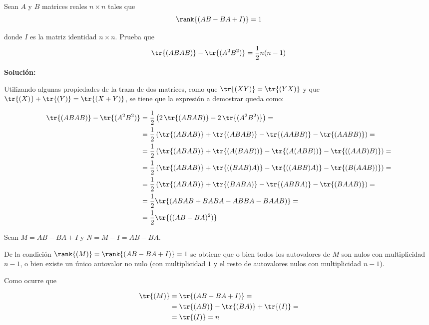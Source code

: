 \documentclass[../../main.tex]{subfiles}
\begin{document}
  \begin{shaded}
    Sean $A$ y $B$ matrices reales $n \times n$ tales que
    $$
    \rank{(AB - BA + I)} = 1
    $$

    donde $I$ es la matriz identidad $n \times n$. Prueba que
    $$
    \tr{(ABAB)} - \tr{(A^2 B^2)} = \frac{1}{2} n (n - 1)
    $$
  \end{shaded}

  \textbf{Solución:}

  Utilizando algunas propiedades de la traza de dos matrices, como que $\tr{(XY)} = \tr{(YX)}$ y que $\tr{(X)} + \tr{(Y)} = \tr{(X + Y)}$, se tiene que la expresión a demostrar queda como:

  \begin{equation*}
    \begin{split}
      \tr{(ABAB)} - \tr{(A^2 B^2)} & =
      \frac{1}{2}\left(2 \, \tr{(ABAB)} - 2 \, \tr{(A^2 B^2)}\right) = \\ & =
      \frac{1}{2}\left(\tr{(ABAB)} + \tr{(ABAB)} - \tr{(AABB)} - \tr{(AABB)}\right) = \\ & =
      \frac{1}{2}\left(\tr{(ABAB)} + \tr{(A(BAB))} - \tr{(A(ABB))} - \tr{((AAB)B)}\right) = \\ & =
      \frac{1}{2}\left(\tr{(ABAB)} + \tr{((BAB)A)} - \tr{((ABB)A)} - \tr{(B(AAB))}\right) = \\ & =
      \frac{1}{2}\left(\tr{(ABAB)} + \tr{(BABA)} - \tr{(ABBA)} - \tr{(BAAB)}\right) = \\ & =
      \frac{1}{2}\tr{(ABAB + BABA - ABBA - BAAB)} = \\ & =
      \frac{1}{2}\tr{((AB - BA)^2)}
    \end{split}
  \end{equation*}

  Sean $M = AB - BA + I$ y $N = M - I = AB - BA$.

  De la condición $\rank{(M)} = \rank{(AB - BA + I)} = 1$ se obtiene que o bien todos los autovalores de $M$ son nulos con multiplicidad $n - 1$, o bien existe un único autovalor no nulo (con multiplicidad $1$ y el resto de autovalores nulos con multiplicidad $n - 1$).

  Como ocurre que

  \begin{equation*}
    \begin{split}
      \tr{(M)} & =
      \tr{(AB - BA + I)} = \\ & =
      \tr{(AB)} - \tr{(BA)} + \tr{(I)} = \\ & =
      \tr{(I)} = n
    \end{split}
  \end{equation*}
\end{document}
